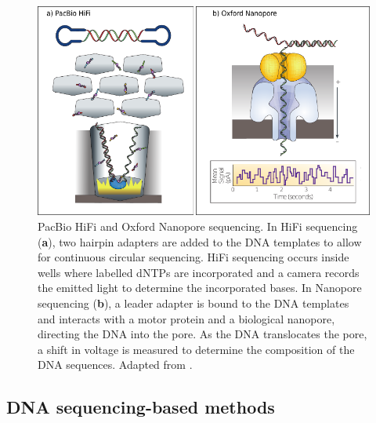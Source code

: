 \begin{figure}[h!]
    \centering
    \includegraphics[angle=0,width=\textwidth]{figures/introduction/Figure6.pdf}
    \caption[PacBio HiFi and Oxford Nanopore sequencing]{PacBio HiFi and Oxford Nanopore sequencing. In HiFi sequencing (\textbf{a}), two hairpin adapters are added to the DNA templates to allow for continuous circular sequencing. HiFi sequencing occurs inside wells where labelled dNTPs are incorporated and a camera records the emitted light to determine the incorporated bases. In Nanopore sequencing (\textbf{b}), a leader adapter is bound to the DNA templates and interacts with a motor protein and a biological nanopore, directing the DNA into the pore. As the DNA translocates the pore, a shift in voltage is measured to determine the composition of the DNA sequences. Adapted from \cite{loman_twenty_2015, goodwin_coming_2016, wang_nanopore_2021, metzker_sequencing_2010}.}
    \label{fig:introduction_figure6}
\end{figure}

\subsection{DNA sequencing-based methods}


